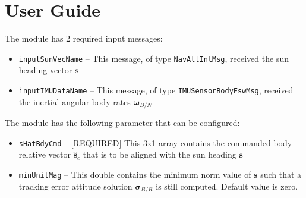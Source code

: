 
\section{User Guide}
The module has 2 required input messages:
\begin{itemize}
	\item {\tt inputSunVecName} -- This message, of type {\tt NavAttIntMsg}, received the sun heading vector $\bm s$
	\item {\tt inputIMUDataName} -- This message, of type {\tt IMUSensorBodyFswMsg}, received the inertial angular body rates $\bm \omega_{B/N}$
\end{itemize}

The module has the following parameter that can be configured:
\begin{itemize}
	\item {\tt sHatBdyCmd} -- [REQUIRED] This 3x1 array contains the commanded body-relative vector $\hat{\bm s}_{c}$ that is to be aligned with the sun heading $\bm s$
	\item {\tt minUnitMag} -- This double contains the minimum norm value of $\bm s$ such that a tracking error attitude solution $\bm\sigma_{B/R}$ is still computed.  Default value is zero. 
\end{itemize}

